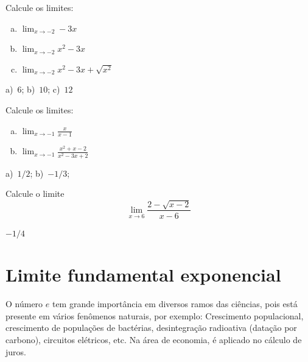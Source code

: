 \cleardoublepage\documentclass[../main.tex]{subfiles}
\begin{document}
\begin{exer}
  Calcule os limites:
  \begin{enumerate}[a)]
  \item $\displaystyle\lim_{x\to -2} -3x$\\
  \item $\displaystyle\lim_{x\to -2} x^2-3x$\\    
  \item $\displaystyle\lim_{x\to -2} x^2-3x+\sqrt{x^2}$\\    
  \end{enumerate}
\end{exer}
\begin{resp}
  a)~$6$; b)~$10$; c)~$12$
\end{resp}

\begin{exer}
  Calcule os limites:
  \begin{multicols}{2}
  \begin{enumerate}[a)]
  \item $\displaystyle\lim_{x\to -1} \frac{x}{x-1}$\\
  \item $\displaystyle\lim_{x\to -1} \frac{x^2+x-2}{x^2-3x+2}$\\    
  \end{enumerate}
  \end{multicols}
\end{exer}
\begin{resp}
  a)~$1/2$; b)~$-1/3$;
\end{resp}

\begin{exer}
  Calcule o limite
  \begin{equation*}
    \lim_{x\to 6} \frac{2-\sqrt{x-2}}{x-6}
  \end{equation*}
\end{exer}
\begin{resp}
  $-1/4$
\end{resp}

\section{Limite fundamental exponencial}\hypertarget{LimFundExp}{}
O número $e$ tem grande importância em diversos ramos das ciências, pois está presente 
em vários fenômenos naturais, por exemplo: Crescimento populacional, crescimento de populações 
de bactérias, desintegração radioativa (datação por carbono), circuitos elétricos, etc. Na área de 
economia, é aplicado no cálculo de juros. 
\end{document}
